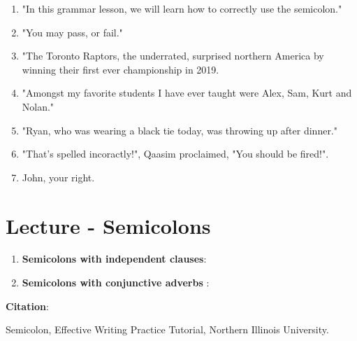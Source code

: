 \documentclass[12pt]{article} %
\begin{document}
\begin{enumerate}
  \item "In this grammar lesson, we will learn how to correctly use the semicolon."
  \item "You may pass, or fail."
  \item "The Toronto Raptors, the underrated, surprised northern America by winning their first ever championship in 2019.
  \item "Amongst my favorite students I have ever taught were Alex, Sam, Kurt and Nolan."
  \item "Ryan, who was wearing a black tie today, was throwing up after dinner."
  \item "That's spelled incoractly!", Qaasim proclaimed, "You should be fired!". 
  \item John, your right.
\end{enumerate}

\section*{Lecture - Semicolons}

\begin{enumerate}
  \item \textbf{Semicolons with independent clauses}:\\

    \vspace*{9cm}


  

  \item \textbf{Semicolons with conjunctive adverbs} : \\

    \vspace*{11cm}


\end{enumerate}

\textbf{Citation}: 

Semicolon, Effective Writing Practice Tutorial, Northern Illinois University.


  
\end{document}
